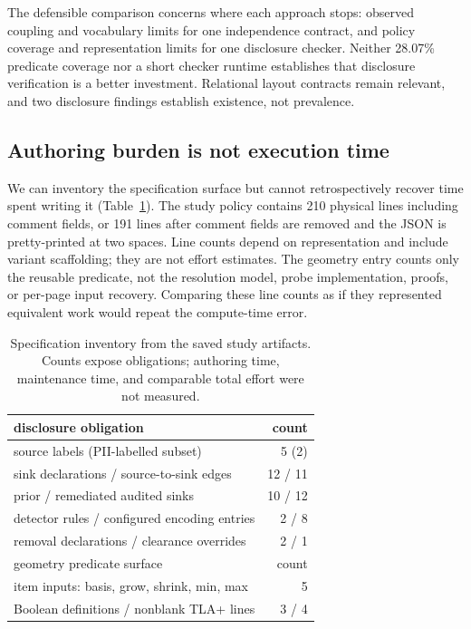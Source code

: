 \documentclass[acmsmall,screen,review,anonymous,nonacm]{acmart}
\begin{document}
The defensible comparison concerns where each approach stops: observed coupling and vocabulary limits for one independence contract, and policy coverage and representation limits for one disclosure checker. Neither 28.07\% predicate coverage nor a short checker runtime establishes that disclosure verification is a better investment. Relational layout contracts remain relevant, and two disclosure findings establish existence, not prevalence.

\subsection{Authoring burden is not execution time}
We can inventory the specification surface but cannot retrospectively recover time spent writing it (Table~\ref{tab:authoring}). The study policy contains 210 physical lines including comment fields, or 191 lines after comment fields are removed and the JSON is pretty-printed at two spaces. Line counts depend on representation and include variant scaffolding; they are not effort estimates. The geometry entry counts only the reusable predicate, not the resolution model, probe implementation, proofs, or per-page input recovery. Comparing these line counts as if they represented equivalent work would repeat the compute-time error.

\begin{table}[t]
\centering\small
\caption{Specification inventory from the saved study artifacts. Counts expose obligations; authoring time, maintenance time, and comparable total effort were not measured.}
\label{tab:authoring}
\begin{tabular}{lr}
\toprule
disclosure obligation & count \\
\midrule
source labels (PII-labelled subset) & 5 (2) \\
sink declarations / source-to-sink edges & 12 / 11 \\
prior / remediated audited sinks & 10 / 12 \\
detector rules / configured encoding entries & 2 / 8 \\
removal declarations / clearance overrides & 2 / 1 \\
\midrule
geometry predicate surface & count \\
\midrule
item inputs: basis, grow, shrink, min, max & 5 \\
Boolean definitions / nonblank TLA+ lines & 3 / 4 \\
\bottomrule
\end{tabular}
\end{table}
\end{document}
